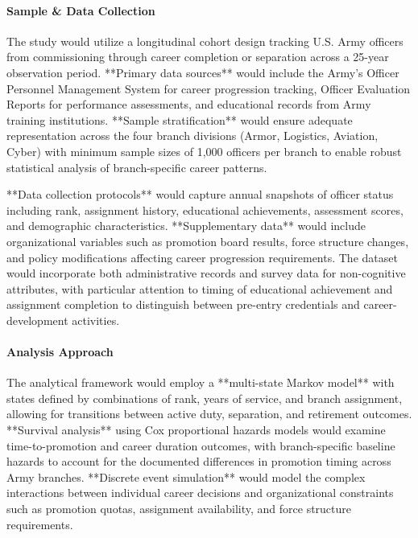 \documentclass[main.tex]{subfiles}
\begin{document}
\paragraph{Sample \& Data Collection}

The study would utilize a longitudinal cohort design tracking U.S. Army officers from commissioning through career completion or separation across a 25-year observation period. **Primary data sources** would include the Army's Officer Personnel Management System for career progression tracking, Officer Evaluation Reports for performance assessments, and educational records from Army training institutions. **Sample stratification** would ensure adequate representation across the four branch divisions (Armor, Logistics, Aviation, Cyber) with minimum sample sizes of 1,000 officers per branch to enable robust statistical analysis of branch-specific career patterns.

**Data collection protocols** would capture annual snapshots of officer status including rank, assignment history, educational achievements, assessment scores, and demographic characteristics. **Supplementary data** would include organizational variables such as promotion board results, force structure changes, and policy modifications affecting career progression requirements. The dataset would incorporate both administrative records and survey data for non-cognitive attributes, with particular attention to timing of educational achievement and assignment completion to distinguish between pre-entry credentials and career-development activities.

\paragraph{Analysis Approach}

The analytical framework would employ a **multi-state Markov model** with states defined by combinations of rank, years of service, and branch assignment, allowing for transitions between active duty, separation, and retirement outcomes. **Survival analysis** using Cox proportional hazards models would examine time-to-promotion and career duration outcomes, with branch-specific baseline hazards to account for the documented differences in promotion timing across Army branches. **Discrete event simulation** would model the complex interactions between individual career decisions and organizational constraints such as promotion quotas, assignment availability, and force structure requirements.
\end{document}
